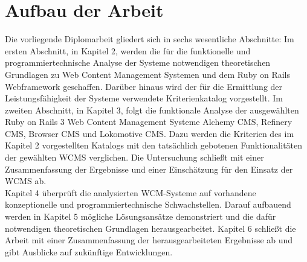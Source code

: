 \section{Aufbau der Arbeit}
Die vorliegende Diplomarbeit gliedert sich in sechs wesentliche Abschnitte:
\newline
\newline
Im ersten Abschnitt, in Kapitel 2, werden die für die funktionelle und programmiertechnische Analyse der Systeme notwendigen theoretischen Grundlagen zu Web Content Management Systemen und dem Ruby on Rails Webframework geschaffen.
Darüber hinaus wird der für die Ermittlung der Leistungsfähigkeit der Systeme verwendete Kriterienkatalog vorgestellt.
\newline
\newline
Im zweiten Abschnitt, in Kapitel 3, folgt die funktionale Analyse der ausgewählten Ruby on Rails 3 Web Content Management Systeme Alchemy CMS, Refinery CMS, Browser CMS und Lokomotive CMS. Dazu werden die Kriterien des im Kapitel 2 vorgestellten Katalogs mit den tatsächlich gebotenen Funktionalitäten der gewählten WCMS verglichen. Die Untersuchung schließt mit einer Zusammenfassung der Ergebnisse und einer Einschätzung für den Einsatz der WCMS ab.\\
\newline
Kapitel 4 überprüft die analysierten WCM-Systeme auf vorhandene konzeptionelle und programmiertechnische Schwachstellen.
Darauf aufbauend werden in Kapitel 5 mögliche Lösungsansätze demonstriert und die dafür notwendigen theoretischen Grundlagen herausgearbeitet.
Kapitel 6 schließt die Arbeit mit einer Zusammenfassung der herausgearbeiteten Ergebnisse ab und gibt Ausblicke auf zukünftige Entwicklungen.
%
%

